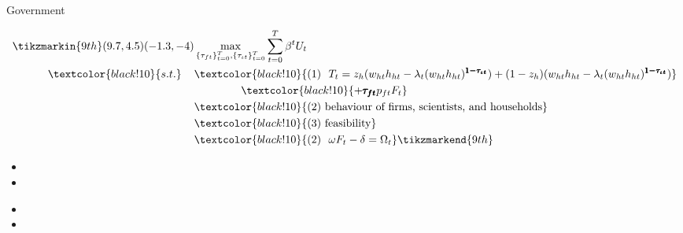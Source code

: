\documentclass[11pt,aspectratio=169]{beamer}
\begin{document}
\begin{frame}{ Government}
	\begin{minipage}[t!]{1\textwidth}
		\begin{align*}
		\tikzmarkin{9th}(9.7,4.5)(-1.3,-4)
		&\max_{\{\tau_{ft}\}_{t=0}^{T}, \{\tau_{\iota t}\}_{t=0}^{T}} \sum_{t=0}^{T}\beta^t U_{t}\\
	\textcolor{black!10}{s.t.} \hspace{4mm}
		&\textcolor{black!10}{ (1)\ \ T_t= z_h(w_{ht}h_{ht}-\lambda_t(w_{ht}h_{ht})^{{\pmb{1-\tau_{\iota t}}}})+(1-z_h)(w_{ht}h_{ht}-\lambda_t(w_{ht}h_{ht})^{{\pmb{1-\tau_{\iota t}}}})}\\ & \hspace{15mm } \textcolor{black!10}{+{\pmb{\tau_{ft}}}p_{ft}F_{t}}\\
		& \textcolor{black!10}{(2)\ \text{behaviour of firms, scientists, and households}}\\
		& \textcolor{black!10}{(3)\ \text{feasibility} }\\
		&\textcolor{black!10}{
			(2)\ \  \omega F_t-\delta =\Omega_t }
		\tikzmarkend{9th}
		\end{align*}
	\end{minipage}
	
	\small
	\vspace{0mm}
	\begin{minipage}[t!]{0.35\textwidth}
		\vspace{7mm}
		\begin{itemize}
			\item[] %
			\item[] 
		\end{itemize}
	\end{minipage}
	\begin{minipage}[t!]{0.6\textwidth}
		\vspace{8mm}
		\begin{itemize}
			\item[]%
			\vspace{0mm}	
			\item[] %
		\end{itemize}
	\end{minipage}
\end{frame}
\end{document}
